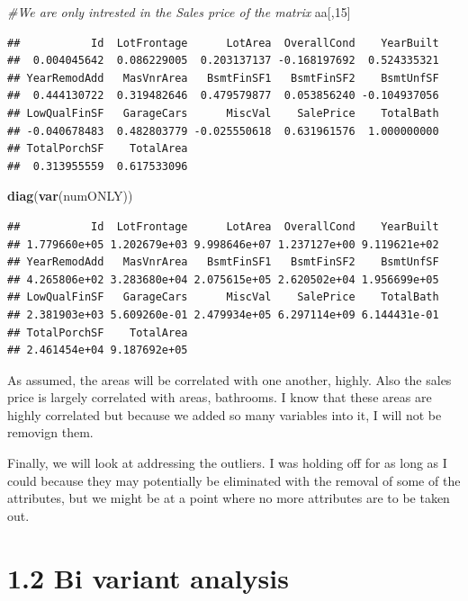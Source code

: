 \documentclass[]{article}
\newenvironment{Shaded}{\begin{snugshade}}{\end{snugshade}}
\newcommand{\KeywordTok}[1]{\textcolor[rgb]{0.13,0.29,0.53}{\textbf{#1}}}
\newcommand{\DecValTok}[1]{\textcolor[rgb]{0.00,0.00,0.81}{#1}}
\newcommand{\CommentTok}[1]{\textcolor[rgb]{0.56,0.35,0.01}{\textit{#1}}}
\newcommand{\NormalTok}[1]{#1}
\begin{document}
\begin{Shaded}
\begin{Highlighting}[]
\CommentTok{#We are only intrested in the Sales price of the matrix}
\NormalTok{aa[,}\DecValTok{15}\NormalTok{]}
\end{Highlighting}
\end{Shaded}

\begin{verbatim}
##           Id  LotFrontage      LotArea  OverallCond    YearBuilt 
##  0.004045642  0.086229005  0.203137137 -0.168197692  0.524335321 
## YearRemodAdd   MasVnrArea   BsmtFinSF1   BsmtFinSF2    BsmtUnfSF 
##  0.444130722  0.319482646  0.479579877  0.053856240 -0.104937056 
## LowQualFinSF   GarageCars      MiscVal    SalePrice    TotalBath 
## -0.040678483  0.482803779 -0.025550618  0.631961576  1.000000000 
## TotalPorchSF    TotalArea 
##  0.313955559  0.617533096
\end{verbatim}

\begin{Shaded}
\begin{Highlighting}[]
\KeywordTok{diag}\NormalTok{(}\KeywordTok{var}\NormalTok{(numONLY))}
\end{Highlighting}
\end{Shaded}

\begin{verbatim}
##           Id  LotFrontage      LotArea  OverallCond    YearBuilt 
## 1.779660e+05 1.202679e+03 9.998646e+07 1.237127e+00 9.119621e+02 
## YearRemodAdd   MasVnrArea   BsmtFinSF1   BsmtFinSF2    BsmtUnfSF 
## 4.265806e+02 3.283680e+04 2.075615e+05 2.620502e+04 1.956699e+05 
## LowQualFinSF   GarageCars      MiscVal    SalePrice    TotalBath 
## 2.381903e+03 5.609260e-01 2.479934e+05 6.297114e+09 6.144431e-01 
## TotalPorchSF    TotalArea 
## 2.461454e+04 9.187692e+05
\end{verbatim}

As assumed, the areas will be correlated with one another, highly. Also
the sales price is largely correlated with areas, bathrooms. I know that
these areas are highly correlated but because we added so many variables
into it, I will not be removign them.

Finally, we will look at addressing the outliers. I was holding off for
as long as I could because they may potentially be eliminated with the
removal of some of the attributes, but we might be at a point where no
more attributes are to be taken out.

\section{1.2 Bi variant analysis}\label{bi-variant-analysis}
\end{document}
